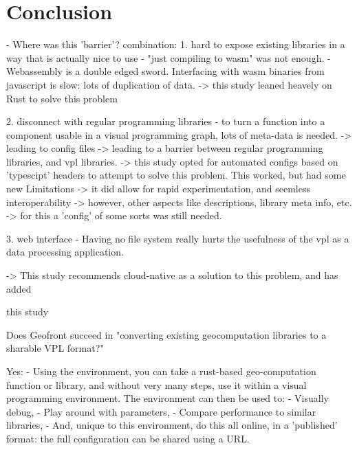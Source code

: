 



\section{Conclusion}

\begin{note}
  
- Where was this 'barrier'?
combination: 
1. hard to expose existing libraries in a way that is actually nice to use
- "just compiling to wasm" was not enough.
- Webassembly is a double edged sword. Interfacing with wasm binaries from javascript is slow: lots of duplication of data. 
-> this study leaned heavely on Rust to solve this problem

2. disconnect with regular programming libraries
- to turn a function into a component usable in a visual programming graph, lots of meta-data is needed. 
  -> leading to config files 
  -> leading to a barrier between regular programming libraries, and vpl libraries. 
  -> this study opted for automated configs based on 'typescipt' headers to attempt to solve this problem. This worked, but had some new Limitations
     -> it did allow for rapid experimentation, and seemless interoperability
     -> however, other aspects like descriptions, library meta info, etc. 
     -> for this a 'config' of some sorts was still needed. 

3. web interface
- Having no file system really hurts the usefulness of the vpl as a data processing application.

-> This study recommends cloud-native as a solution to this problem, and has added 


this study 



Does Geofront succeed in "converting existing geocomputation libraries to a sharable VPL format?" 

Yes: 
 - Using the environment, you can take a rust-based geo-computation function or library, 
   and without very many steps, use it within a visual programming environment. 
   The environment can then be used to:
   - Visually debug, 
   - Play around with parameters, 
   - Compare performance to similar libraries,
   - And, unique to this environment, do this all online, in a 'published' format: the full configuration can be shared using a URL. 


\end{note}
